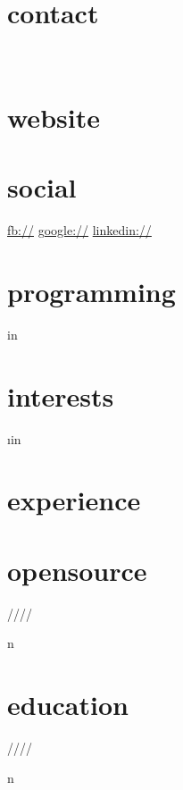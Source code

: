 \documentclass[]{fancy-cv}
\begin{document}
\header{\MakeLowercase\myfirstname}{\MakeLowercase\mylastname}{\MakeLowercase\mytitle}

\begin{aside}
  \section{contact}
    \href{mailto:\myemail}{\myemail}
    ~
    \myphone
    ~
    \myaddress%
    \mycity
  \section{website}
    \href{\mywebsite}{\mywebsite}
  \section{social}
    \href{http://facebook.com/\myfb}{fb://\myfb}
    \href{http://plug.google.com/\mygp}{google://\mygp}
    \href{http://www.linkedin.com/in/\mylinkedin}{linkedin://\mylinkedin}
  \section{programming}
     \lang in \programming {%
      \lang
    }%
  \section{interests}
     \i in \interests {%
      \MakeLowercase\i
    }%
\end{aside}

\section{experience}
\label{sec:experience}


\vspace{-2em}

\section{opensource}
\begin{entrylist}
 \year/\degree/\school/\city/\subtitle in \positions {
  \entry{\year}{\degree}{\school}{\vspace{-1cm}}
}
\end{entrylist}

\vspace{-2em}
\section{education}
\label{sec:education}

\begin{entrylist}
 \year/\degree/\school/\city/\subtitle in \education {
  \entry{\year}{\degree}{\school}{\subtitle}
}
\end{entrylist}
\end{document}
